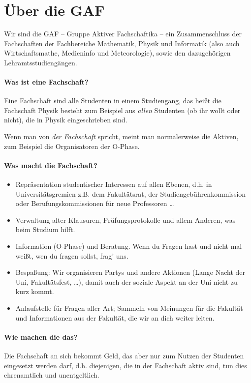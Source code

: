 \section{Über die GAF}

Wir sind die GAF -- Gruppe Aktiver Fachschaftika -- ein
Zusammenschluss der Fachschaften der Fachbereiche
Mathematik,
Physik
und Informatik (also auch Wirtschaftsmathe, Medieninfo und
Meteorologie), sowie den dazugehörigen Lehramtsstudiengängen.

\paragraph{Was ist eine Fachschaft?}

Eine Fachschaft sind alle Studenten in einem Studiengang, das heißt die Fachschaft Physik besteht zum Beispiel aus \emph{allen} Studenten (ob ihr wollt oder nicht), die in Physik eingeschrieben sind.

Wenn man von \emph{der Fachschaft} spricht, meint man normalerweise die Aktiven,
zum Beispiel die Organisatoren der O-Phase.

\paragraph{Was macht die Fachschaft?}
\begin{itemize}
\item Repräsentation studentischer Interessen auf allen Ebenen, d.h. in Universitätsgremien z.B. dem Fakultätsrat, der Studiengebührenkommission oder Berufungskommissionen für neue Professoren \ldots
\item Verwaltung alter Klausuren, Prüfungsprotokolle und allem Anderen, was beim Studium hilft.
\item Information (O-Phase) und Beratung. Wenn du Fragen hast und nicht mal weißt, wen du fragen sollst, frag' uns.
\item Bespaßung: Wir organisieren Partys und andere Aktionen (Lange Nacht der Uni, Fakultätsfest, \ldots), damit auch der soziale Aspekt an der Uni nicht zu kurz kommt.
\item Anlaufstelle für Fragen aller Art; Sammeln von Meinungen für die Fakultät und Informationen aus der Fakultät, die wir an dich weiter leiten.
\end{itemize}

\paragraph{Wie machen die das?}
Die Fachschaft an sich bekommt Geld, das aber nur zum Nutzen der
Studenten eingesetzt werden darf, d.h. diejenigen, die in der
Fachschaft aktiv sind, tun dies ehrenamtlich und unentgeltlich.

